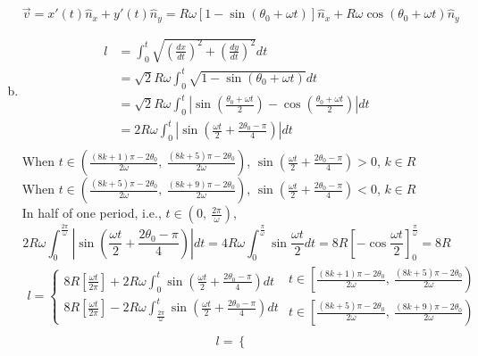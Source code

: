 \documentclass{article}
\begin{document}
\begin{enumerate}[(a)]
		$$\vec{v}=x'(t)\hat{n}_x+y'(t)\hat{n}_y
		=R\omega[1-\sin(\theta_0+\omega t)]\hat{n}_x
		+R\omega\cos(\theta_0+\omega t)\hat{n}_y$$
	\item
		\begin{align*}
			l&=\int_0^t\sqrt{\left(\frac{dx}{dt}\right)^2+\left(\frac{dy}{dt}\right)^2}dt\\
			&=\sqrt{2}R\omega\int_0^t\sqrt{1-\sin(\theta_0+\omega t)}dt\\
			&=\sqrt{2}R\omega\int_0^t\left|\sin\left(\frac{\theta_0+\omega t}{2}\right)-\cos\left(\frac{\theta_0+\omega t}{2}\right)\right|dt\\
			&=2R\omega\int_0^t\left|\sin\left(\frac{\omega t}{2}+\frac{2\theta_0-\pi}{4}\right)\right|dt\\
		\end{align*}
		When $t\in \left(\frac{(8k+1)\pi-2\theta_0}{2\omega},\ \frac{(8k+5)\pi-2\theta_0}{2\omega}\right)$, $\sin\left(\frac{\omega t}{2}+\frac{2\theta_0-\pi}{4}\right)>0$, $k\in R$\\
		When $t\in \left(\frac{(8k+5)\pi-2\theta_0}{2\omega},\ \frac{(8k+9)\pi-2\theta_0}{2\omega}\right)$, $\sin\left(\frac{\omega t}{2}+\frac{2\theta_0-\pi}{4}\right)<0$, $k\in R$\\
		In half of one period, i.e., $t\in\left(0,\ \frac{2\pi}{\omega}\right)$, 
		$$2R\omega\int_0^{\frac{2\pi}{\omega}}\left|\sin\left(\frac{\omega t}{2}+\frac{2\theta_0-\pi}{4}\right)\right|dt
		=4R\omega\int_0^{\frac{\pi}{\omega}}\sin\frac{\omega t}{2}dt
		=8R\left[-\cos\frac{\omega t}{2}\right]_0^{\frac{\pi}{\omega}}
		=8R$$
		\begin{eqnarray*}
			l=\left\{
			\begin{array}{lll}
				8R\left[\frac{\omega t}{2\pi}\right]+2R\omega\int_0^t\sin\left(\frac{\omega t}{2}+\frac{2\theta_0-\pi}{4}\right)dt\\
				8R\left[\frac{\omega t}{2\pi}\right]-2R\omega\int_{\frac{2\pi}{\omega}}^t\sin\left(\frac{\omega t}{2}+\frac{2\theta_0-\pi}{4}\right)dt
			\end{array}
			\right.\left.
			\begin{array}{lll}
				t\in \left[\frac{(8k+1)\pi-2\theta_0}{2\omega},\ \frac{(8k+5)\pi-2\theta_0}{2\omega}\right)\\
				t\in \left[\frac{(8k+5)\pi-2\theta_0}{2\omega},\ \frac{(8k+9)\pi-2\theta_0}{2\omega}\right)
			\end{array}
			\right.
		\end{eqnarray*}
		\begin{eqnarray*}
			l=\left\{
			\begin{array}{lll}

\end{array}
\end{eqnarray*}
\end{enumerate}
\end{document}
